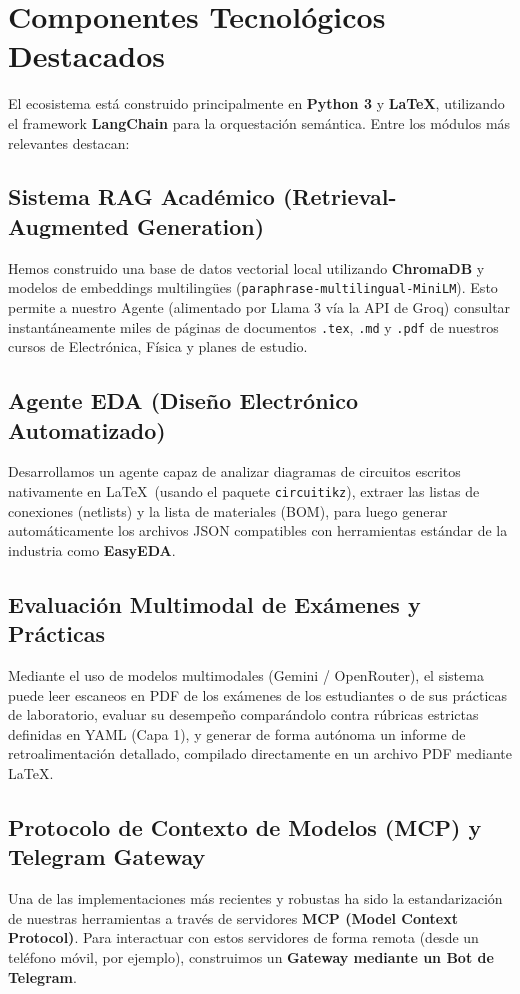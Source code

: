 \documentclass[12pt,letterpaper]{article}
\begin{document}
\section{Componentes Tecnológicos Destacados}

El ecosistema está construido principalmente en \textbf{Python 3} y \textbf{\LaTeX}, utilizando el framework \textbf{LangChain} para la orquestación semántica. Entre los módulos más relevantes destacan:

\subsection{Sistema RAG Académico (Retrieval-Augmented Generation)}
Hemos construido una base de datos vectorial local utilizando \textbf{ChromaDB} y modelos de embeddings multilingües (\texttt{paraphrase-multilingual-MiniLM}). Esto permite a nuestro Agente (alimentado por Llama 3 vía la API de Groq) consultar instantáneamente miles de páginas de documentos \texttt{.tex}, \texttt{.md} y \texttt{.pdf} de nuestros cursos de Electrónica, Física y planes de estudio.

\subsection{Agente EDA (Diseño Electrónico Automatizado)}
Desarrollamos un agente capaz de analizar diagramas de circuitos escritos nativamente en \LaTeX\ (usando el paquete \texttt{circuitikz}), extraer las listas de conexiones (netlists) y la lista de materiales (BOM), para luego generar automáticamente los archivos JSON compatibles con herramientas estándar de la industria como \textbf{EasyEDA}.

\subsection{Evaluación Multimodal de Exámenes y Prácticas}
Mediante el uso de modelos multimodales (Gemini / OpenRouter), el sistema puede leer escaneos en PDF de los exámenes de los estudiantes o de sus prácticas de laboratorio, evaluar su desempeño comparándolo contra rúbricas estrictas definidas en YAML (Capa 1), y generar de forma autónoma un informe de retroalimentación detallado, compilado directamente en un archivo PDF mediante \LaTeX.

\subsection{Protocolo de Contexto de Modelos (MCP) y Telegram Gateway}
Una de las implementaciones más recientes y robustas ha sido la estandarización de nuestras herramientas a través de servidores \textbf{MCP (Model Context Protocol)}. Para interactuar con estos servidores de forma remota (desde un teléfono móvil, por ejemplo), construimos un \textbf{Gateway mediante un Bot de Telegram}.
\end{document}
